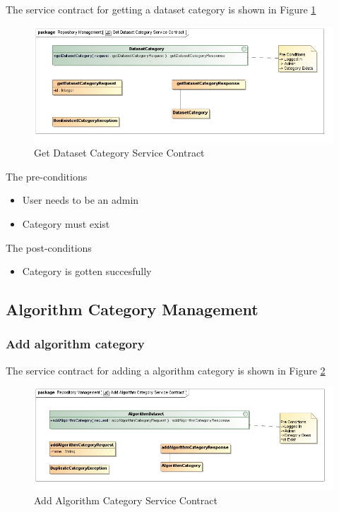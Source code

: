 The service contract for getting a dataset category is shown in Figure \ref{fig:getDatasetCatService}
\begin{figure}[H]
  \begin{center}
  \includegraphics[scale=0.6]{../Diagrams and Charts/Test Data/Get Dataset Category Service Contract.jpg}
  \caption{Get Dataset Category Service Contract}
  \label{fig:getDatasetCatService}
  \end{center}
  
\end{figure}

The pre-conditions
\begin{itemize}
  \item User needs to be an admin
  \item Category must exist
\end{itemize}

The post-conditions
\begin{itemize}
  \item Category is gotten succesfully
\end{itemize}

\subsection{Algorithm Category Management}

\subsubsection {Add algorithm category}
The service contract for adding a algorithm category is shown in Figure \ref{fig:addAlgorithmCatService}
\begin{figure}[H]
  \begin{center}
  \includegraphics[scale=0.6]{../Diagrams and Charts/Test Data/Add Algorithm Category Service Contract.jpg}
  \caption{Add Algorithm Category Service Contract}
  \label{fig:addAlgorithmCatService}
  \end{center}
  
\end{figure}

